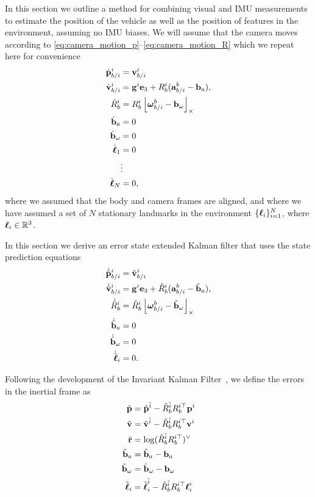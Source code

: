 In this section we outline a method for combining visual and IMU measurements to estimate the position of the vehicle as well as the position of features in the environment, assuming no IMU biases.  We will assume that the camera moves according to \eqref{eq:camera_motion_p}--\eqref{eq:camera_motion_R} which we repeat here for convenience
\begin{align*}
\dot{\mathbf{p}}_{b/i}^i &= \mathbf{v}_{b/i}^i   \\
\dot{\mathbf{v}}_{b/i}^i &= \mathbf{g}^i \mathbf{e}_3 + R_b^i (\mathbf{a}_{b/i}^b-\mathbf{b}_a),  \\
\dot{R}_b^i &= R_b^i \left\lfloor\boldsymbol{\omega}_{b/i}^b-\mathbf{b}_\omega\right\rfloor_{\times} \\
\dot{\mathbf{b}}_a &= 0 \\
\dot{\mathbf{b}}_\omega &= 0 \\
\dot{\boldsymbol{\ell}}_1 &= 0 \\
&\vdots \\ 
\dot{\boldsymbol{\ell}}_N &= 0,
\end{align*}
where we assumed that the body and camera frames are aligned, and where we have assumed a set of $N$ stationary landmarks in the environment $\{\boldsymbol{\ell}_i\}_{i=1}^N$, where $\boldsymbol{\ell}_i\in\mathbb{R}^3$.

In this section we derive an error state extended Kalman filter that uses the state prediction equations
\begin{align*}
\dot{\hat{\mathbf{p}}}_{b/i}^i &= \hat{\mathbf{v}}_{b/i}^i   \\
\dot{\hat{\mathbf{v}}}_{b/i}^i &= \mathbf{g}^i \mathbf{e}_3 + \hat{R}_b^i (\mathbf{a}_{b/i}^b -\hat{\mathbf{b}}_a),  \\
\dot{\hat{R}}_b^i &= \hat{R}_b^i \left\lfloor\boldsymbol{\omega}_{b/i}^b-\hat{\mathbf{b}}_\omega\right\rfloor_{\times} \\
\dot{\hat{\mathbf{b}}}_a &= 0 \\
\dot{\hat{\mathbf{b}}}_\omega &= 0 \\
\dot{\hat{\boldsymbol{\ell}}}_i &= 0.
\end{align*}

Following the development of the Invariant Kalman Filter~\cite{}, we define the errors in the inertial frame as
\begin{align*}
    \tilde{\mathbf{p}} &= \hat{\mathbf{p}}^{\hat{i}}-\hat{R}_b^{\hat{i}}R_b^{i\top} \mathbf{p}^i \\
    \tilde{\mathbf{v}} &= \hat{\mathbf{v}}^{\hat{i}}-\hat{R}_b^{\hat{i}}R_b^{i\top} \mathbf{v}^i \\
    \tilde{\mathbf{r}} &= \log(\hat{R}_b^{\hat{i}} R_b^{i\top})^\vee \\
    \tilde{\mathbf{b}}_a &= \hat{\mathbf{b}}_a - \mathbf{b}_a \\
	\tilde{\mathbf{b}}_\omega &= \hat{\mathbf{b}}_\omega - \mathbf{b}_\omega \\
    \tilde{\boldsymbol{\ell}}_i &= \hat{\boldsymbol{\ell}}_i^{\hat{i}}-\hat{R}_b^{\hat{i}}R_b^{i\top} \boldsymbol{\ell}_i^i
\end{align*}

